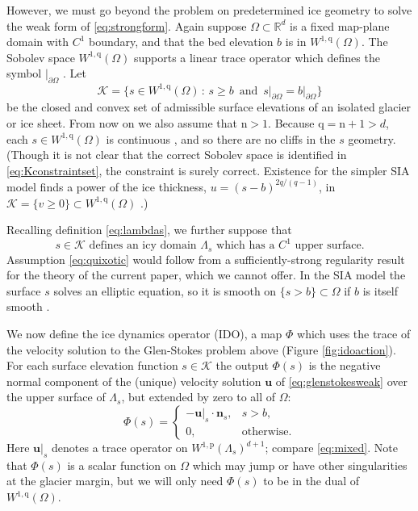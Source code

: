 \documentclass[letterpaper,final,12pt,reqno]{amsart}
\theoremstyle{claim}
\newcommand{\RR}{\mathbb{R}}
\newcommand{\bn}{\mathbf{n}}
\newcommand{\bu}{\mathbf{u}}
\newcommand{\nn}{{\text{n}}}
\newcommand{\pp}{{\text{p}}}
\newcommand{\qq}{{\text{q}}}
\numberwithin{equation}{section}
\numberwithin{figure}{section}
\numberwithin{table}{section}
\numberwithin{theorem}{section}
\begin{document}
However, we must go beyond the problem on predetermined ice geometry to solve the weak form of \eqref{eq:strongform}.  Again suppose $\Omega \subset \RR^d$ is a fixed map-plane domain with $C^1$ boundary, and that the bed elevation $b$ is in $W^{1,\qq}(\Omega)$.  The Sobolev space $W^{1,\qq}(\Omega)$ supports a linear trace operator which defines the symbol $|_{\partial \Omega}$ \cite[Section 5.5]{Evans2010}.  Let
\begin{equation}
\mathcal{K} = \{s \in W^{1,\qq}(\Omega) \,:\, s \ge b \, \text{ and } \, s\big|_{\partial\Omega} = b\big|_{\partial\Omega}\}  \label{eq:Kconstraintset}
\end{equation}
be the closed and convex set of admissible surface elevations of an isolated glacier or ice sheet.  From now on we also assume that $\nn>1$.  Because $\qq = \nn+1 > d$, each $s \in W^{1,\qq}(\Omega)$ is continuous \cite[Morrey's inequality, section 5.6.2]{Evans2010}, and so there are no cliffs in the $s$ geometry.  (Though it is not clear that the correct Sobolev space is identified in \eqref{eq:Kconstraintset}, the constraint is surely correct.  Existence for the simpler SIA model finds a power of the ice thickness, $u=(s-b)^{2q/(q-1)}$, in $\mathcal{K} = \{v \ge 0\} \subset W^{1,\qq}(\Omega)$ \cite{JouvetBueler2012}.)

Recalling definition \eqref{eq:lambdas}, we further suppose that
\begin{equation}
s\in \mathcal{K} \text{ defines an icy domain } \Lambda_s \text{ which has a $C^1$ upper surface.} \label{eq:quixotic}
\end{equation}
Assumption \eqref{eq:quixotic} would follow from a sufficiently-strong regularity result for the theory of the current paper, which we cannot offer.  In the SIA model the surface $s$ solves an elliptic equation, so it is smooth on $\{s>b\} \subset \Omega$ if $b$ is itself smooth \cite{JouvetBueler2012}.

We now define the ice dynamics operator (IDO), a map $\Phi$ which uses the trace of the velocity solution to the Glen-Stokes problem above (Figure \ref{fig:idoaction}).  For each surface elevation function $s \in \mathcal{K}$ the output $\Phi(s)$ is the negative normal component of the (unique) velocity solution $\bu$ of \eqref{eq:glenstokesweak} over the upper surface of $\Lambda_s$, but extended by zero to all of $\Omega$:
\begin{equation}
\Phi(s) = \begin{cases} - \bu|_s \cdot \bn_s, & s > b, \\
                        0, & \text{otherwise}. \end{cases} \label{eq:ido}
\end{equation}
Here $\bu|_s$ denotes a trace operator on $W^{1,\pp}(\Lambda_s)^{d+1}$; compare \eqref{eq:mixed}.  Note that $\Phi(s)$ is a scalar function on $\Omega$ which may jump or have other singularities at the glacier margin, but we will only need $\Phi(s)$ to be in the dual of $W^{1,\qq}(\Omega)$.
\end{document}
